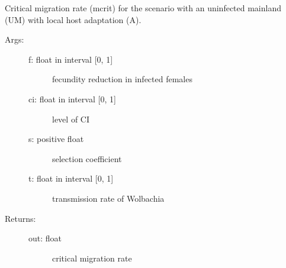 \documentclass[letterpaper,10pt,english]{sphinxmanual}
\begin{document}
\begin{fulllineitems}
\label{index:wspec.analytical.mcrit_UMA}
Critical migration rate (mcrit) for the scenario with an uninfected 
mainland (UM) with local host adaptation (A).
\begin{description}
\item[{Args:}] \leavevmode\begin{description}
\item[{f: float in interval {[}0, 1{]}}] \leavevmode
fecundity reduction in infected females

\item[{ci: float in interval {[}0, 1{]}}] \leavevmode
level of CI

\item[{s: positive float}] \leavevmode
selection coefficient

\item[{t: float in interval {[}0, 1{]}}] \leavevmode
transmission rate of Wolbachia

\end{description}

\item[{Returns:}] \leavevmode\begin{description}
\item[{out: float}] \leavevmode
critical migration rate

\end{description}

\end{description}

\end{fulllineitems}

\end{document}
